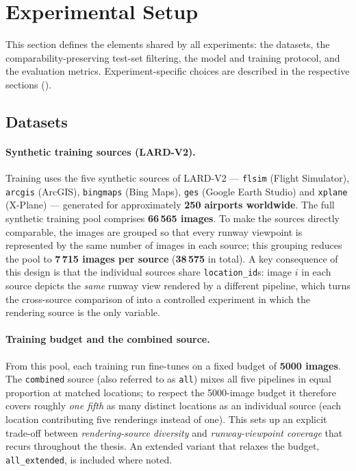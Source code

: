 \section{Experimental Setup}
\label{sec:setup}

This section defines the elements shared by all experiments: the datasets, the
comparability-preserving test-set filtering, the model and training protocol, and the
evaluation metrics. Experiment-specific choices are described in the respective
sections ().

\subsection{Datasets}
\label{subsec:setup-data}

\paragraph{Synthetic training sources (LARD-V2).}
Training uses the five synthetic sources of LARD-V2 --- \texttt{flsim} (Flight
Simulator), \texttt{arcgis} (ArcGIS), \texttt{bingmaps} (Bing Maps), \texttt{ges}
(Google Earth Studio) and \texttt{xplane} (X-Plane) --- generated for approximately
\textbf{250 airports worldwide}. The full synthetic training pool comprises
\textbf{66\,565 images}. To make the sources directly comparable, the images are
grouped so that every runway viewpoint is represented by the same number of images in
each source; this grouping reduces the pool to \textbf{7\,715 images per source}
(\textbf{38\,575} in total). A key consequence of this design is that the individual
sources share \texttt{location\_id}s: image $i$ in each source depicts the \emph{same}
runway view rendered by a different pipeline, which turns the cross-source comparison
of  into a controlled experiment in which the rendering source is the
only variable.

\paragraph{Training budget and the combined source.}
From this pool, each training run fine-tunes on a fixed budget of \textbf{5000
images}. The \texttt{combined} source (also referred to as \texttt{all}) mixes all
five pipelines in equal proportion at matched locations; to respect the 5000-image
budget it therefore covers roughly \emph{one fifth} as many distinct locations as an
individual source (each location contributing five renderings instead of one). This
sets up an explicit trade-off between \emph{rendering-source diversity} and
\emph{runway-viewpoint coverage} that recurs throughout the thesis. An extended
variant that relaxes the budget, \texttt{all\_extended}, is included where noted.

